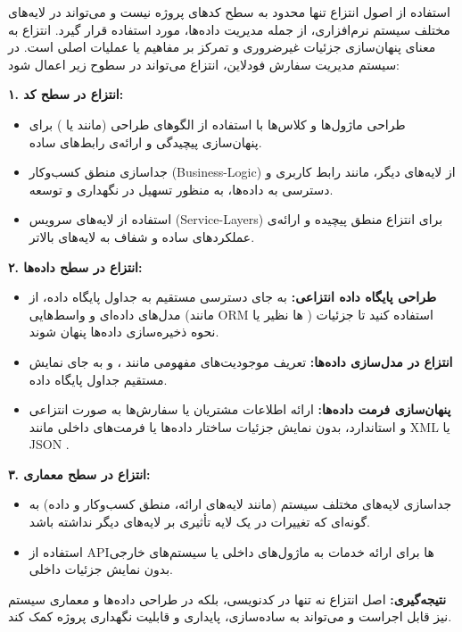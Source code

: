 
\begin{flushright}

	
	استفاده از اصول انتزاع تنها محدود به سطح کدهای پروژه نیست و می‌تواند در لایه‌های مختلف سیستم نرم‌افزاری، از جمله مدیریت داده‌ها، مورد استفاده قرار گیرد. انتزاع به معنای پنهان‌سازی جزئیات غیرضروری و تمرکز بر مفاهیم یا عملیات اصلی است. در سیستم مدیریت سفارش فودلاین، انتزاع می‌تواند در سطوح زیر اعمال شود:
	
	\textbf{۱. انتزاع در سطح کد:}
	\begin{itemize}
		\item طراحی ماژول‌ها و کلاس‌ها با استفاده از الگوهای طراحی (مانند  یا ) برای پنهان‌سازی پیچیدگی و ارائه‌ی رابط‌های ساده.
		\item جداسازی منطق کسب‌وکار (Business-Logic) از لایه‌های دیگر، مانند رابط کاربری و دسترسی به داده‌ها، به منظور تسهیل در نگهداری و توسعه.
		\item استفاده از لایه‌های سرویس (Service-Layers) برای انتزاع منطق پیچیده و ارائه‌ی عملکردهای ساده و شفاف به لایه‌های بالاتر.
	\end{itemize}
	
	\textbf{۲. انتزاع در سطح داده‌ها:}
	\begin{itemize}
		\item \textbf{طراحی پایگاه داده انتزاعی:} به جای دسترسی مستقیم به جداول پایگاه داده، از مدل‌های داده‌ای و واسط‌هایی (مانند ORM ‌ها نظیر  یا ) استفاده کنید تا جزئیات نحوه ذخیره‌سازی داده‌ها پنهان شوند.
		\item \textbf{انتزاع در مدل‌سازی داده‌ها:} تعریف موجودیت‌های مفهومی مانند ،  و  به جای نمایش مستقیم جداول پایگاه داده.
		\item \textbf{پنهان‌سازی فرمت داده‌ها:} ارائه اطلاعات مشتریان یا سفارش‌ها به صورت انتزاعی و استاندارد، بدون نمایش جزئیات ساختار داده‌ها یا فرمت‌های داخلی مانند XML یا JSON .
	\end{itemize}
	
	\textbf{۳. انتزاع در سطح معماری:}
	\begin{itemize}
		\item جداسازی لایه‌های مختلف سیستم (مانند لایه‌های ارائه، منطق کسب‌وکار و داده) به گونه‌ای که تغییرات در یک لایه تأثیری بر لایه‌های دیگر نداشته باشد.
		\item استفاده از APIها برای ارائه خدمات به ماژول‌های داخلی یا سیستم‌های خارجی بدون نمایش جزئیات داخلی.
	\end{itemize}
	
	\textbf{نتیجه‌گیری:} 
	اصل انتزاع نه تنها در کدنویسی، بلکه در طراحی داده‌ها و معماری سیستم نیز قابل اجراست و می‌تواند به ساده‌سازی، پایداری و قابلیت نگهداری پروژه کمک کند.
\end{flushright}

